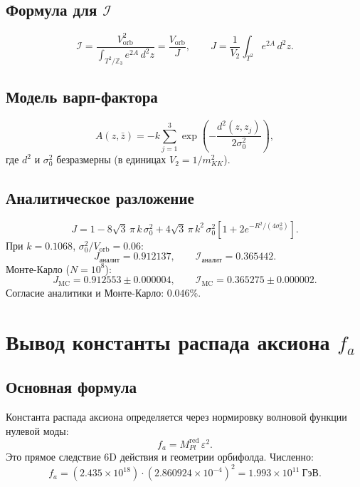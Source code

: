 \documentclass[12pt,a4paper]{article}
\numberwithin{equation}{section}
\begin{document}
\subsection{Формула для $\mathcal{I}$}
\begin{equation}
\boxed{\;\mathcal{I} = \frac{V_{\text{orb}}^2}
{\int_{T^2/\mathbb{Z}_3} e^{2A}\,d^2z} = \frac{V_{\text{orb}}}{J},\qquad 
J = \frac{1}{V_2}\int_{T^2} e^{2A}\,d^2z.\;}
\end{equation}

\subsection{Модель варп-фактора}
\begin{equation}
A(z,\bar z) = -k\sum_{j=1}^{3}
\exp\!\left(-\frac{d^2(z,z_j)}{2\sigma_0^2}\right),
\end{equation}
где $d^2$ и $\sigma_0^2$ безразмерны (в единицах $V_2 = 1/m_{KK}^2$).

\subsection{Аналитическое разложение}
\begin{equation}
J = 1 - 8\sqrt3\,\pi\,k\,\sigma_0^2 
+ 4\sqrt3\,\pi\,k^2\,\sigma_0^2\left[1 + 2e^{-R^2/(4\sigma_0^2)}\right].
\end{equation}
При $k = 0.1068$, $\sigma_0^2/V_{\text{orb}} = 0.06$:
\begin{equation}
J_{\text{аналит}} = 0.912137, \qquad \mathcal{I}_{\text{аналит}} = 0.365442.
\end{equation}
Монте-Карло ($N = 10^8$):
\begin{equation}
\boxed{\;J_{\text{MC}} = 0.912553 \pm 0.000004, \qquad 
\mathcal{I}_{\text{MC}} = 0.365275 \pm 0.000002.\;}
\end{equation}
Согласие аналитики и Монте-Карло: $0.046\%$.

\section{Вывод константы распада аксиона $f_a$}

\subsection{Основная формула}
Константа распада аксиона определяется через нормировку волновой 
функции нулевой моды:
\begin{equation}
\boxed{\;f_a = M_{Pl}^{\text{red}}\,\varepsilon^2.\;}
\label{eq:fa-principles}
\end{equation}
Это прямое следствие 6D действия и геометрии орбифолда. Численно:
\begin{equation}
f_a = (2.435\times 10^{18})\cdot (2.860924\times 10^{-4})^2 
= 1.993\times 10^{11}~\text{ГэВ}.
\end{equation}
\end{document}
